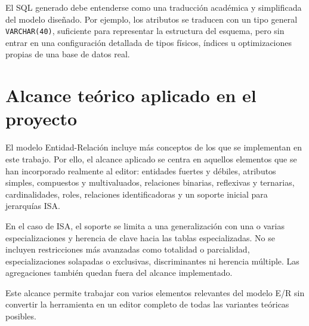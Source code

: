 El SQL generado debe entenderse como una traducción académica y simplificada del modelo diseñado. Por ejemplo, los atributos se traducen con un tipo general \texttt{VARCHAR(40)}, suficiente para representar la estructura del esquema, pero sin entrar en una configuración detallada de tipos físicos, índices u optimizaciones propias de una base de datos real.

\section{Alcance teórico aplicado en el proyecto}

El modelo Entidad-Relación incluye más conceptos de los que se implementan en este trabajo. Por ello, el alcance aplicado se centra en aquellos elementos que se han incorporado realmente al editor: entidades fuertes y débiles, atributos simples, compuestos y multivaluados, relaciones binarias, reflexivas y ternarias, cardinalidades, roles, relaciones identificadoras y un soporte inicial para jerarquías ISA.

En el caso de ISA, el soporte se limita a una generalización con una o varias especializaciones y herencia de clave hacia las tablas especializadas. No se incluyen restricciones más avanzadas como totalidad o parcialidad, especializaciones solapadas o exclusivas, discriminantes ni herencia múltiple. Las agregaciones también quedan fuera del alcance implementado.

Este alcance permite trabajar con varios elementos relevantes del modelo E/R sin convertir la herramienta en un editor completo de todas las variantes teóricas posibles.